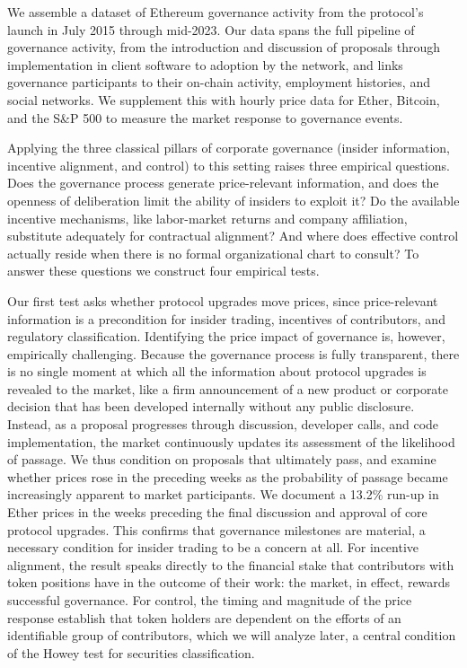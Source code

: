 \documentclass[No]{AEA}
\begin{document}
We assemble a dataset of Ethereum governance activity from the protocol's launch in July 2015 through mid-2023. Our data spans the full pipeline of governance activity, from the introduction and discussion of proposals through implementation in client software to adoption by the network, and links governance participants to their on-chain activity, employment histories, and social networks. We supplement this with hourly price data for Ether, Bitcoin, and the S\&P 500 to measure the market response to governance events.

Applying the three classical pillars of corporate governance (insider information, incentive alignment, and control) to this setting raises three empirical questions. Does the governance process generate price-relevant information, and does the openness of deliberation limit the ability of insiders to exploit it? Do the available incentive mechanisms, like labor-market returns and company affiliation, substitute adequately for contractual alignment? And where does effective control actually reside when there is no formal organizational chart to consult? To answer these questions we construct four empirical tests.

Our first test asks whether protocol upgrades move prices, since price-relevant information is a precondition for insider trading, incentives of contributors, and regulatory classification. Identifying the price impact of governance is, however, empirically challenging. Because the governance process is fully transparent, there is no single moment at which all the information about protocol upgrades is revealed to the market, like a firm announcement of a new product or corporate decision that has been developed internally without any public disclosure. Instead, as a proposal progresses through discussion, developer calls, and code implementation, the market continuously updates its assessment of the likelihood of passage. We thus condition on proposals that ultimately pass, and examine whether prices rose in the preceding weeks as the probability of passage became increasingly apparent to market participants. We document a 13.2\% run-up in Ether prices in the weeks preceding the final discussion and approval of core protocol upgrades. This confirms that governance milestones are material, a necessary condition for insider trading to be a concern at all. For incentive alignment, the result speaks directly to the financial stake that contributors with token positions have in the outcome of their work: the market, in effect, rewards successful governance. For control, the timing and magnitude of the price response establish that token holders are dependent on the efforts of an identifiable group of contributors, which we will analyze later, a central condition of the Howey test for securities classification.
\end{document}
